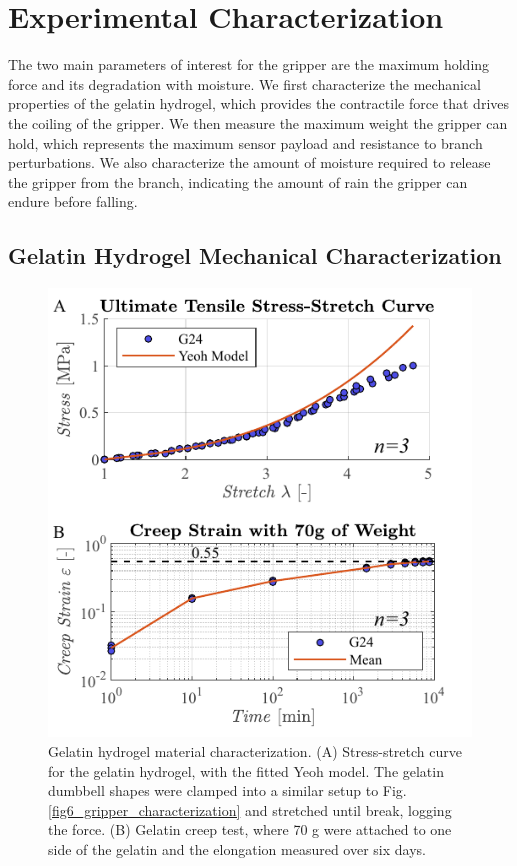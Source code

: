 \section{Experimental Characterization}
The two main parameters of interest for the gripper are the maximum holding force and its degradation with moisture. We first characterize the mechanical properties of the gelatin hydrogel, which provides the contractile force that drives the coiling of the gripper. We then measure the maximum weight the gripper can hold, which represents the maximum sensor payload and resistance to branch perturbations. We also characterize the amount of moisture required to release the gripper from the branch, indicating the amount of rain the gripper can endure before falling. %

\subsection{Gelatin Hydrogel Mechanical Characterization}

\begin{figure}[!t]
\centering
\includegraphics[width=1\columnwidth]{figures/figure4-gelatin_charac/figure4-gelatin-charac.pdf}%
\caption{Gelatin hydrogel material characterization. (A) Stress-stretch curve for the gelatin hydrogel, with the fitted Yeoh model. The gelatin dumbbell shapes were clamped into a similar setup to Fig. \ref{fig6_gripper_characterization} and stretched until break, logging the force. (B) Gelatin creep test, where 70 g were attached to one side of the gelatin and the elongation measured over six days.}
\label{fig4_gelatin_charac}
\end{figure}

